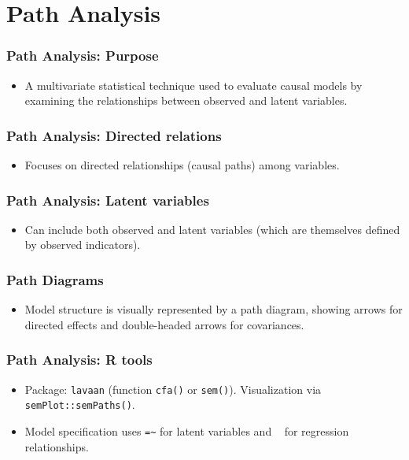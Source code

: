 \documentclass{beamer}
\newcommand{\code}[1]{\texttt{#1}}
\begin{document}
\section{Path Analysis}

\begin{frame}
    \frametitle{Path Analysis: Purpose}
    \begin{itemize}
        \item A multivariate statistical technique used to evaluate \alert{causal models} by examining the relationships between observed and latent variables.
    \end{itemize}
\end{frame}

\begin{frame}
    \frametitle{Path Analysis: Directed relations}
    \begin{itemize}
        \item Focuses on directed relationships (causal paths) among variables.
    \end{itemize}
\end{frame}

\begin{frame}
    \frametitle{Path Analysis: Latent variables}
    \begin{itemize}
        \item Can include both observed and \alert{latent variables} (which are themselves defined by observed indicators).
    \end{itemize}
\end{frame}

\begin{frame}
    \frametitle{Path Diagrams}
    \begin{itemize}
        \item Model structure is visually represented by a \alert{path diagram}, showing arrows for directed effects and double-headed arrows for covariances.
    \end{itemize}
\end{frame}

\begin{frame}
    \frametitle{Path Analysis: R tools}
    \begin{itemize}
        \item Package: \code{lavaan} (function \code{cfa()} or \code{sem()}). Visualization via \code{semPlot::semPaths()}.
        \item Model specification uses \texttt{=\~} for latent variables and \texttt{~} for regression relationships.
    \end{itemize}
\end{frame}
\end{document}
